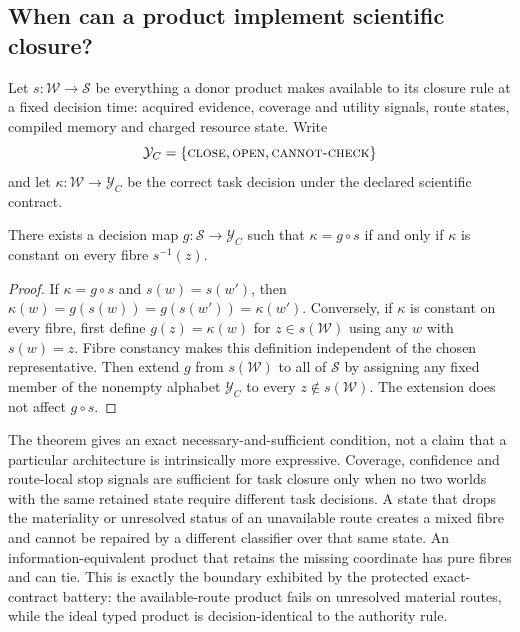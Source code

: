 \subsection{When can a product implement scientific closure?}

Let $s:\mathcal W\rightarrow\mathcal S$ be everything a donor product makes
available to its closure rule at a fixed decision time: acquired evidence,
coverage and utility signals, route states, compiled memory and charged
resource state.  Write
\[
 \mathcal Y_C=\{\textsc{close},\textsc{open},\textsc{cannot-check}\}
\]
and let $\kappa:\mathcal W\rightarrow\mathcal Y_C$ be the correct task
decision under the declared scientific contract.

\begin{theorem}
\label{thm:factorization}
There exists a decision map $g:\mathcal S\rightarrow\mathcal Y_C$ such that
$\kappa=g\circ s$ if and only if $\kappa$ is constant on every fibre
$s^{-1}(z)$.
\end{theorem}

\begin{proof}
If $\kappa=g\circ s$ and $s(w)=s(w')$, then
$\kappa(w)=g(s(w))=g(s(w'))=\kappa(w')$.  Conversely, if $\kappa$ is constant
on every fibre, first define $g(z)=\kappa(w)$ for $z\in s(\mathcal W)$ using
any $w$ with $s(w)=z$. Fibre constancy makes this definition independent of
the chosen representative. Then extend $g$ from $s(\mathcal W)$ to all of
$\mathcal S$ by assigning any fixed member of the nonempty alphabet
$\mathcal Y_C$ to every $z\notin s(\mathcal W)$. The extension does not affect
$g\circ s$.
\end{proof}

The theorem gives an exact necessary-and-sufficient condition, not a claim that
a particular architecture is intrinsically more expressive.  Coverage,
confidence and route-local stop signals are sufficient for task closure only
when no two worlds with the same retained state require different task
decisions.  A state that drops the materiality or unresolved status of an
unavailable route creates a mixed fibre and cannot be repaired by a different
classifier over that same state.  An information-equivalent product that
retains the missing coordinate has pure fibres and can tie.  This is exactly the
boundary exhibited by the protected exact-contract battery: the available-route
product fails on unresolved material routes, while the ideal typed product is
decision-identical to the authority rule.

